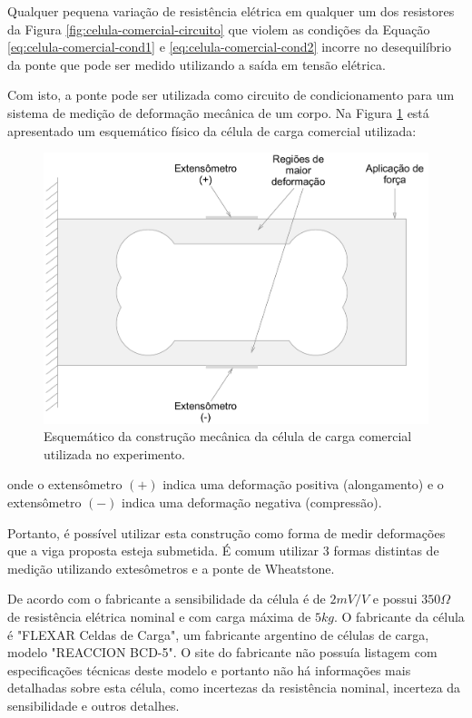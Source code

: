 \documentclass[a4paper]{instrumentacao}
\begin{document}
Qualquer pequena variação de resistência elétrica em qualquer um dos resistores da Figura \ref{fig:celula-comercial-circuito} que violem as condições da Equação \ref{eq:celula-comercial-cond1} e \ref{eq:celula-comercial-cond2} incorre no desequilíbrio da ponte que pode ser medido utilizando a saída em tensão elétrica.

Com isto, a ponte pode ser utilizada como circuito de condicionamento para um sistema de medição de deformação mecânica de um corpo. Na Figura \ref{fig:celula-comercial-esquema-fisico} está apresentado um esquemático físico da célula de carga comercial utilizada:

\begin{figure}[H]
\center
\includegraphics[width=\textwidth]{CelulaComercial.pdf}
\caption{Esquemático da construção mecânica da célula de carga comercial utilizada no experimento.}
\label{fig:celula-comercial-esquema-fisico}
\end{figure}

\noindent onde o extensômetro $(+)$ indica uma deformação positiva (alongamento) e o extensômetro $(-)$ indica uma deformação negativa (compressão).

Portanto, é possível utilizar esta construção como forma de medir deformações que a viga proposta esteja submetida. É comum utilizar 3 formas distintas de medição utilizando extesômetros e a ponte de Wheatstone.


De acordo com o fabricante a sensibilidade da célula é de $2 mV/V$ e possui $350 \Omega$ de resistência elétrica nominal e com carga máxima de $5 kg$.  O fabricante da célula é "FLEXAR Celdas de Carga", um fabricante argentino de células de carga, modelo "REACCION BCD-5". O site do fabricante não possuía listagem com especificações técnicas deste modelo e portanto não há informações mais detalhadas sobre esta célula, como incertezas da resistência nominal, incerteza da sensibilidade e outros detalhes.
\end{document}
